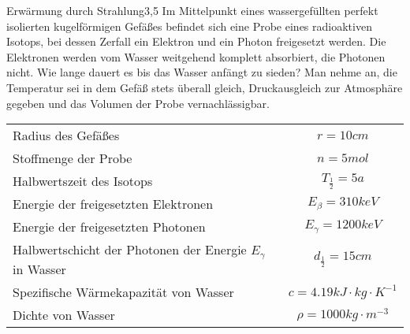 \begin{problem}{Erwärmung durch Strahlung}{3,5}
Im Mittelpunkt eines wassergefüllten perfekt isolierten kugelförmigen Gefäßes befindet sich eine Probe eines radioaktiven Isotops, bei dessen Zerfall ein Elektron und ein Photon freigesetzt werden. Die Elektronen werden vom Wasser weitgehend komplett absorbiert, die Photonen nicht. Wie lange dauert es bis das Wasser anfängt zu sieden? Man nehme an, die Temperatur sei in dem Gefäß stets überall gleich, Druckausgleich zur Atmosphäre gegeben und das Volumen der Probe vernachlässigbar.
\begin{center}
\begin{tabular}{lc}
\toprule
Radius des Gefäßes & $r = 10 \unit{cm}$\\
Stoffmenge der Probe & $n = 5 \unit{mol}$\\
Halbwertszeit des Isotops & $T_{\frac12} = 5 \unit{a}$\\
Energie der freigesetzten Elektronen & $E_\beta = 310 \unit{keV}$\\
Energie der freigesetzten Photonen & $E_\gamma = 1200 \unit{keV}$\\
Halbwertschicht der Photonen der Energie $E_\gamma$ in Wasser & $d_{\frac12} = 15 \unit{cm}$\\
Spezifische Wärmekapazität von Wasser & $c = 4.19 \unit{kJ \cdot kg \cdot K^{-1}}$\\
Dichte von Wasser & $\rho = 1000 \unit{kg \cdot m^{-3}}$
\bottomrule
\end{tabular}
\end{center}
\end{problem}


